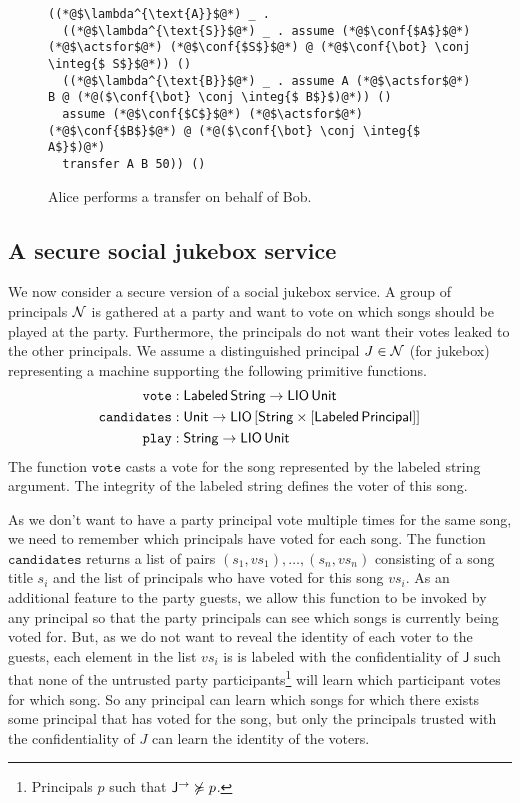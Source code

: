 \begin{figure}
\centering
\begin{lstlisting}
((*@$\lambda^{\text{A}}$@*) _ .
  ((*@$\lambda^{\text{S}}$@*) _ . assume (*@$\conf{$A$}$@*) (*@$\actsfor$@*) (*@$\conf{$S$}$@*) @ (*@$\conf{\bot} \conj \integ{$ S$}$@*)) ()
  ((*@$\lambda^{\text{B}}$@*) _ . assume A (*@$\actsfor$@*) B @ (*@($\conf{\bot} \conj \integ{$ B$}$)@*)) ()
  assume (*@$\conf{$C$}$@*) (*@$\actsfor$@*) (*@$\conf{$B$}$@*) @ (*@($\conf{\bot} \conj \integ{$ A$}$)@*)
  transfer A B 50)) ()
\end{lstlisting}
\caption{Alice performs a transfer on behalf of Bob.}
\label{fig:sec-bank-alice-banks-for-bob}
\end{figure}

\subsection{A secure social jukebox service}
We now consider a secure version of a social jukebox service. A group of principals $\mathcal{N}$ is gathered at a party and want to vote on which songs should be played at the party. Furthermore, the principals do not want their votes leaked to the other principals. We assume a distinguished principal $J \in \mathcal{N}$ (for jukebox) representing a machine supporting the following primitive functions.
\begin{align*}
\mathtt{vote}&: \mathsf{Labeled}\,\mathsf{String} \to \mathsf{LIO}\,\mathsf{Unit}\\
\mathtt{candidates}&: \mathsf{Unit} \to \mathsf{LIO}\,\lbrack\mathsf{String} \times \lbrack\mathsf{Labeled}\,\mathsf{Principal}\rbrack\rbrack\\
\mathtt{play}&: \mathsf{String} \to \mathsf{LIO}\,\mathsf{Unit}
\end{align*}
The function $\mathtt{vote}$ casts a vote for the song represented by the labeled string argument. The integrity of the labeled string defines the voter of this song.

As we don't want to have a party principal vote multiple times for the same song, we need to remember which principals have voted for each song. The function $\mathtt{candidates}$ returns a list of pairs $(s_1, \mathit{vs}_1), \dots, (s_n, {\mathit{vs}}_n)$ consisting of a song title $s_i$ and the list of principals who have voted for this song $\mathit{vs}_i$. As an additional feature to the party guests, we allow this function to be invoked by any principal so that the party principals can see which songs is currently being voted for. But, as we do not want to reveal the identity of each voter to the guests, each element in the list $\mathit{vs}_i$ is is labeled with the confidentiality of $\mathsf{J}$ such that none of the untrusted party participants\footnote{Principals $p$ such that $\mathsf{J}^{\rightarrow} \not\succcurlyeq p$.} will learn which participant votes for which song. So any principal can learn which songs for which there exists some principal that has voted for the song, but only the principals trusted with the confidentiality of $J$ can learn the identity of the voters.

